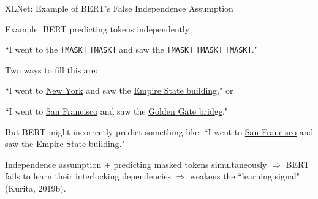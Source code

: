 \begin{frame}{XLNet: Example of BERT's False Independence Assumption}
    
    \vspace{10pt}
    
    \begin{exampleBlock}{Example: BERT predicting tokens independently}
    \footnotesize 
    
    ``I went to the \texttt{[MASK]} \texttt{[MASK]} and saw the \texttt{[MASK]} \texttt{[MASK]} \texttt{[MASK]}." \newline 
    
    Two ways to fill this are: \newline
    
    ``I went to \underline{New York} and saw the \underline{Empire State building}," or\newline
    
    ``I went to \underline{San Francisco} and saw the \underline{Golden Gate bridge}."\newline
    
    But BERT might incorrectly predict something like: ``I went to \underline{San Francisco} and saw the \underline{Empire State building}." \newline
    
    Independence assumption + predicting masked tokens simultaneously $\Rightarrow$ BERT fails to learn their interlocking dependencies $\Rightarrow$ weakens the ``learning signal" (Kurita, 2019b). 
    \end{exampleBlock}

\end{frame}


